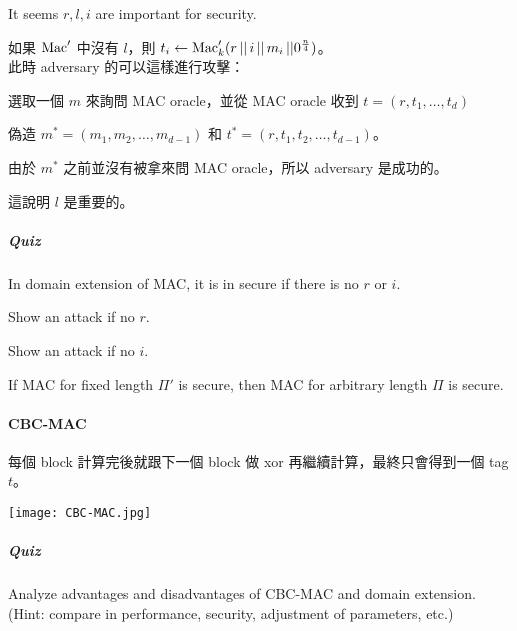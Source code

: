 It seems \(r, l, i\) are important for security.

如果 \(\operatorname{\mathrm{Mac}}'\) 中沒有 \(l\)，則 \(t_i \leftarrow \operatorname{\mathrm{Mac}}'_k(r \, || \, i \, || \, m_i \, || 0^{\frac{n}{4}})\)。 \\
此時 adversary 的可以這樣進行攻擊：
\begin{steps}
	\item 選取一個 \(m\) 來詢問 MAC oracle，並從 MAC oracle 收到 \(t = (r, t_1, \ldots, t_d)\)
	\item 偽造 \(m^\ast = (m_1, m_2, \ldots, m_{d-1})\) 和 \(t^\ast = (r, t_1, t_2, \ldots, t_{d-1})\)。
\end{steps}

由於 \(m^\ast\) 之前並沒有被拿來問 MAC oracle，所以 adversary 是成功的。

這說明 \(l\) 是重要的。

\subparagraph{Quiz}

In domain extension of MAC, it is in secure if there is no \(r\) or \(i\).
\begin{myEnumerate}[label=(\arabic*)]
	\item Show an attack if no \(r\).
	\item Show an attack if no \(i\).
\end{myEnumerate}

\begin{theorem}
	If MAC for fixed length \(\Pi'\) is secure, then MAC for arbitrary length \(\Pi\) is secure.
\end{theorem}


\paragraph{CBC-MAC}

每個 block 計算完後就跟下一個 block 做 xor 再繼續計算，最終只會得到一個 tag \(t\)。

\begin{center}
	\texttt{[image: CBC-MAC.jpg]}
\end{center}

\subparagraph{Quiz}

Analyze advantages and disadvantages of CBC-MAC and domain extension. \\ 
(Hint: compare in performance, security, adjustment of parameters, etc.)
